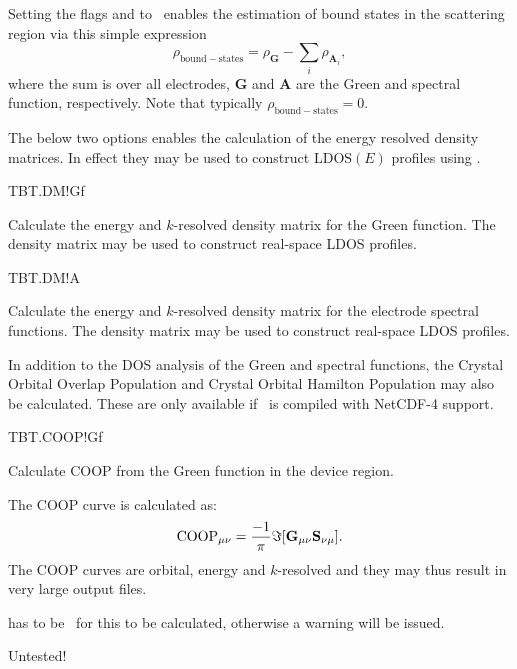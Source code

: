 Setting the flags  and  to
\fdftrue\ enables the estimation of bound states in the scattering
region via this simple expression
\begin{equation}
  \rho_{\mathrm{bound-states}} = \rho_{\mathbf G} - 
  \sum_i \rho_{\mathbf A_i},
\end{equation}
where the sum is over all electrodes, $\mathbf G$ and $\mathbf A$ are
the Green and spectral function, respectively. Note that typically
$\rho_{\mathrm{bound-states}}=0$.

The below two options enables the calculation of the energy resolved
density matrices. In effect they may be used to construct
$\mathrm{LDOS}(E)$ profiles using \sisl.

\begin{fdflogicalF}{TBT.DM!Gf}

  Calculate the energy and $k$-resolved density matrix for the Green
  function. The density matrix may be used to construct 
  real-space LDOS profiles.
  
\end{fdflogicalF}

\begin{fdflogicalF}{TBT.DM!A}

  Calculate the energy and $k$-resolved density matrix for the
  electrode spectral functions. The density matrix may be used to
  construct real-space LDOS profiles.
  
\end{fdflogicalF}


In addition to the DOS analysis of the Green and spectral functions,
the Crystal Orbital Overlap Population and Crystal Orbital Hamilton
Population may also be calculated. These are only available if
\tbtrans\ is compiled with NetCDF-4 support.

\begin{fdflogicalF}{TBT.COOP!Gf}

  Calculate COOP from the Green function in the device region.

  The COOP curve is calculated as:
  \begin{equation}
    \label{eq:COOP-Gf}
    \mathrm{COOP}_{\mu\nu} = \frac{-1}\pi\Im[\mathbf G_{\mu\nu} \mathbf{S}_{\nu\mu}].
  \end{equation}
  The COOP curves are orbital, energy and $k$-resolved and they may
  thus result in very large output files.

  \note {} has to be \fdftrue\ for this to be
  calculated, otherwise a warning will be issued.

  \note Untested!

\end{fdflogicalF}

